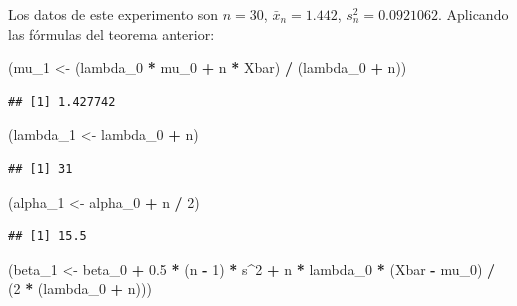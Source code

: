 \documentclass[
  12pt,
]{book}
\newenvironment{Shaded}{\begin{snugshade}}{\end{snugshade}}
\newcommand{\DecValTok}[1]{\textcolor[rgb]{0.00,0.00,0.81}{#1}}
\newcommand{\FloatTok}[1]{\textcolor[rgb]{0.00,0.00,0.81}{#1}}
\newcommand{\NormalTok}[1]{#1}
\newcommand{\OperatorTok}[1]{\textcolor[rgb]{0.81,0.36,0.00}{\textbf{#1}}}
\newcommand{\StringTok}[1]{\textcolor[rgb]{0.31,0.60,0.02}{#1}}
\begin{document}
Los datos de este experimento son \(n = 30\), \(\bar x_n = 1.442\), \(s_n^2 = 0.0921062\). Aplicando las fórmulas del teorema anterior:

\begin{Shaded}
\begin{Highlighting}[]
\NormalTok{(mu\_}\DecValTok{1}\NormalTok{ \textless{}{-}}\StringTok{ }\NormalTok{(lambda\_}\DecValTok{0} \OperatorTok{*}\StringTok{ }\NormalTok{mu\_}\DecValTok{0} \OperatorTok{+}\StringTok{ }\NormalTok{n }\OperatorTok{*}\StringTok{ }\NormalTok{Xbar) }\OperatorTok{/}\StringTok{ }\NormalTok{(lambda\_}\DecValTok{0} \OperatorTok{+}\StringTok{ }\NormalTok{n))}
\end{Highlighting}
\end{Shaded}

\begin{verbatim}
## [1] 1.427742
\end{verbatim}

\begin{Shaded}
\begin{Highlighting}[]
\NormalTok{(lambda\_}\DecValTok{1}\NormalTok{ \textless{}{-}}\StringTok{ }\NormalTok{lambda\_}\DecValTok{0} \OperatorTok{+}\StringTok{ }\NormalTok{n)}
\end{Highlighting}
\end{Shaded}

\begin{verbatim}
## [1] 31
\end{verbatim}

\begin{Shaded}
\begin{Highlighting}[]
\NormalTok{(alpha\_}\DecValTok{1}\NormalTok{ \textless{}{-}}\StringTok{ }\NormalTok{alpha\_}\DecValTok{0} \OperatorTok{+}\StringTok{ }\NormalTok{n }\OperatorTok{/}\StringTok{ }\DecValTok{2}\NormalTok{)}
\end{Highlighting}
\end{Shaded}

\begin{verbatim}
## [1] 15.5
\end{verbatim}

\begin{Shaded}
\begin{Highlighting}[]
\NormalTok{(beta\_}\DecValTok{1}\NormalTok{ \textless{}{-}}\StringTok{ }\NormalTok{beta\_}\DecValTok{0} \OperatorTok{+}\StringTok{ }\FloatTok{0.5} \OperatorTok{*}\StringTok{ }\NormalTok{(n }\OperatorTok{{-}}\StringTok{ }\DecValTok{1}\NormalTok{) }\OperatorTok{*}\StringTok{ }\NormalTok{s}\OperatorTok{\^{}}\DecValTok{2} \OperatorTok{+}\StringTok{ }\NormalTok{n }\OperatorTok{*}\StringTok{ }\NormalTok{lambda\_}\DecValTok{0} \OperatorTok{*}\StringTok{ }\NormalTok{(Xbar }\OperatorTok{{-}}\StringTok{ }\NormalTok{mu\_}\DecValTok{0}\NormalTok{) }\OperatorTok{/}\StringTok{ }\NormalTok{(}\DecValTok{2} \OperatorTok{*}\StringTok{ }\NormalTok{(lambda\_}\DecValTok{0} \OperatorTok{+}\StringTok{ }\NormalTok{n)))}
\end{Highlighting}
\end{Shaded}
\end{document}
